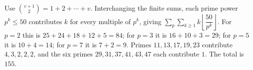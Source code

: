 Use $\binom{v+1}{2}=1+2+\cdots+v$. Interchanging the finite sums, each prime power $p^k\le50$ contributes $k$ for every multiple of $p^k$, giving $\sum_p\sum_{k\ge1}k\left\lfloor\dfrac{50}{p^k}\right\rfloor$. For $p=2$ this is $25+24+18+12+5=84$; for $p=3$ it is $16+10+3=29$; for $p=5$ it is $10+4=14$; for $p=7$ it is $7+2=9$. Primes $11,13,17,19,23$ contribute $4,3,2,2,2$, and the six primes $29,31,37,41,43,47$ each contribute $1$. The total is $\boxed{155}$.

